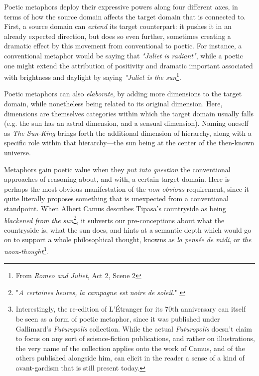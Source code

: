 Poetic metaphors deploy their expressive powers along four different axes, in terms of how the source domain affects the target domain that is connected to. First, a source domain can \emph{extend} its target counterpart: it pushes it in an already expected direction, but does so even further, sometimes creating a dramatic effect by this movement from conventional to poetic. For instance, a conventional metaphor would be saying that \emph{"Juliet is radiant"}, while a poetic one might extend the attribution of positivity and dramatic important associated with brightness and daylight by saying \emph{"Juliet is the sun}\footnote{From \emph{Romeo and Juliet}, Act 2, Scene 2}.

Poetic metaphors can also \emph{elaborate}, by adding more dimensions to the target domain, while nonetheless being related to its original dimension. Here, dimensions are themselves categories within which the target domain usually falls (e.g. the sun has an astral dimension, and a sensual dimension). Naming oneself as \emph{The Sun-King} brings forth the additional dimension of hierarchy, along with a specific role within that hierarchy—the sun being at the center of the then-known universe.

Metaphors gain poetic value when they \emph{put into question} the conventional approaches of reasoning about, and with, a certain target domain. Here is perhaps the most obvious manifestation of the \emph{non-obvious} requirement, since it quite literally proposes something that is unexpected from a conventional standpoint. When Albert Camus describes Tipasa's countryside as being \emph{blackened from the sun}\footnote{"\emph{A certaines heures, la campagne est noire de soleil.}" \citep{camus_noces_1972}}, it subverts our pre-conceptions about what the countryside is, what the sun does, and hints at a semantic depth which would go on to support a whole philosophical thought, knowns as \emph{la pensée de midi}, or \emph{the noon-thought}\footnote{Interestingly, the re-edition of L'Étranger for its 70th anniversary can itself be seen as a form of poetic metaphor, since it was published under Gallimard's \emph{Futuropolis} collection. While the actual \emph{Futuropolis} doesn't claim to focus on any sort of science-fiction publications, and rather on illustrations, the very name of the collection applies onto the work of Camus, and of the others published alongside him, can elicit in the reader a sense of a kind of avant-gardism that is still present today.}.

